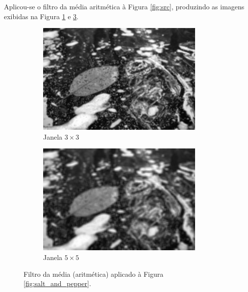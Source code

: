 \documentclass[10pt,a4paper]{article}
\begin{document}
Aplicou-se o filtro da média aritmética à Figura \ref{fig:src}, produzindo as imagens exibidas na Figura \ref{fig:avg_filter3} e \ref{fig:avg_filter5}.

\begin{figure}[!ht]
    \centering
    \begin{subfigure}[ht]{0.45\textwidth}
        \includegraphics[width=\textwidth]{dst_sp_avg3.jpg}
        \caption{Janela $3 \times 3$}
        \label{fig:avg_filter3}
    \end{subfigure}
    \qquad
    \begin{subfigure}[ht]{0.45\textwidth}
        \includegraphics[width=\textwidth]{dst_sp_avg5.jpg}
        \caption{Janela $5 \times 5$}
        \label{fig:avg_filter5}
    \end{subfigure}
    \caption{Filtro da média (aritmética) aplicado à Figura \ref{fig:salt_and_pepper}.}
\end{figure}
\end{document}
